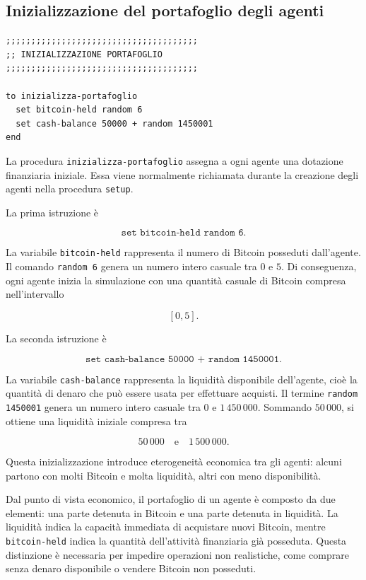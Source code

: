 \subsection{Inizializzazione del portafoglio degli agenti}

\begin{lstlisting}[caption={Procedura di inizializzazione del portafoglio individuale}]
;;;;;;;;;;;;;;;;;;;;;;;;;;;;;;;;;;;;;;
;; INIZIALIZZAZIONE PORTAFOGLIO
;;;;;;;;;;;;;;;;;;;;;;;;;;;;;;;;;;;;;;

to inizializza-portafoglio
  set bitcoin-held random 6
  set cash-balance 50000 + random 1450001
end
\end{lstlisting}

La procedura \texttt{inizializza-portafoglio} assegna a ogni agente una dotazione
finanziaria iniziale. Essa viene normalmente richiamata durante la creazione
degli agenti nella procedura \texttt{setup}.

La prima istruzione è

\[
\texttt{set bitcoin-held random 6}.
\]

La variabile \texttt{bitcoin-held} rappresenta il numero di Bitcoin posseduti
dall'agente. Il comando \texttt{random 6} genera un numero intero casuale tra
\(0\) e \(5\). Di conseguenza, ogni agente inizia la simulazione con una quantità
casuale di Bitcoin compresa nell'intervallo

\[
[0,5].
\]

La seconda istruzione è

\[
\texttt{set cash-balance 50000 + random 1450001}.
\]

La variabile \texttt{cash-balance} rappresenta la liquidità disponibile
dell'agente, cioè la quantità di denaro che può essere usata per effettuare
acquisti. Il termine \texttt{random 1450001} genera un numero intero casuale tra
\(0\) e \(1\,450\,000\). Sommando \(50\,000\), si ottiene una liquidità iniziale
compresa tra

\[
50\,000
\quad \text{e} \quad
1\,500\,000.
\]

Questa inizializzazione introduce eterogeneità economica tra gli agenti: alcuni
partono con molti Bitcoin e molta liquidità, altri con meno disponibilità.

Dal punto di vista economico, il portafoglio di un agente è composto da due
elementi: una parte detenuta in Bitcoin e una parte detenuta in liquidità. La
liquidità indica la capacità immediata di acquistare nuovi Bitcoin, mentre
\texttt{bitcoin-held} indica la quantità dell'attività finanziaria già posseduta.
Questa distinzione è necessaria per impedire operazioni non realistiche, come
comprare senza denaro disponibile o vendere Bitcoin non posseduti.

